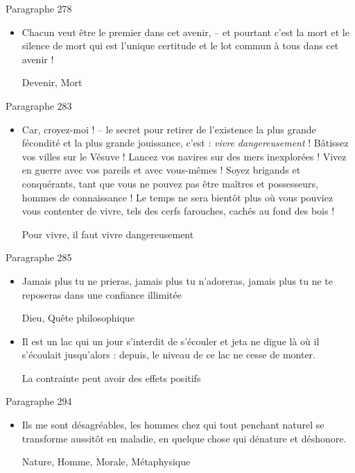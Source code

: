 \documentclass[french,a4paper,11pt,answers]{exam}
\newcommand{\cit}[2]{\og #1 \fg{} \begin{solution}{ #2 }\end{solution}} %
\begin{document}
	\begin{cadre}{Paragraphe 278}
		\begin{itemize}
			\item \cit{Chacun veut être le premier dans cet avenir, -- et pourtant c'est la mort et le silence de mort qui est l'unique certitude et le lot commun à tous dans cet avenir !}
				{Devenir, Mort}
		\end{itemize}
	\end{cadre}
	
	\begin{cadre}{Paragraphe 283}
		\begin{itemize}
			\item \cit{Car, croyez-moi ! -- le secret pour retirer de l'existence la plus grande fécondité et la plus grande jouissance, c'est : \emph{vivre dangereusement} ! Bâtissez vos villes sur le Vésuve ! Lancez vos navires sur des mers inexplorées ! Vivez en guerre avec vos pareils et avec vous-mêmes ! Soyez brigands et conquérants, tant que vous ne pouvez pas être maîtres et possesseurs, hommes de connaissance ! Le temps ne sera bientôt plus où vous pouviez vous contenter de vivre, tels des cerfs farouches, cachés au fond des bois !}
				{Pour vivre, il faut vivre dangereusement}
		\end{itemize}
	\end{cadre}
	
	\begin{cadre}{Paragraphe 285}
		\begin{itemize}
			\item \cit{Jamais plus tu ne prieras, jamais plus tu n'adoreras, jamais plus tu ne te reposeras dans une confiance illimitée}
				{Dieu, Quête philosophique}
			\item \cit{Il est un lac qui un jour s'interdit de s'écouler et jeta ne digue là où il s'écoulait jusqu'alors : depuis, le niveau de ce lac ne cesse de monter.}
				{La contrainte peut avoir des effets positifs}
		\end{itemize}
	\end{cadre}
	
	\begin{cadre}{Paragraphe 294}
		\begin{itemize}
			\item \cit{Ils me sont désagréables, les hommes chez qui tout penchant naturel se transforme aussitôt en maladie, en quelque chose qui dénature et déshonore.}
				{Nature, Homme, Morale, Métaphysique}
		\end{itemize}
	\end{cadre}
\end{document}
